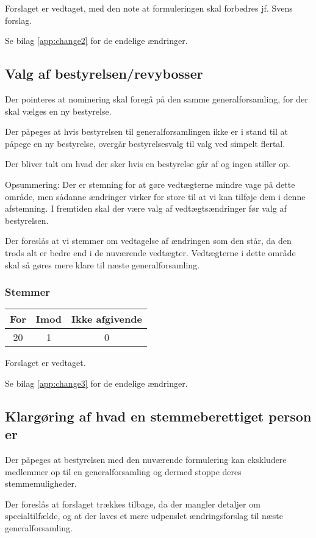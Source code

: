 \documentclass[a4paper,11pt]{report}
\begin{document}
Forslaget er vedtaget, med den note at formuleringen skal forbedres jf. Svens
forslag.

Se bilag \ref{app:change2} for de endelige ændringer.

\subsection*{Valg af bestyrelsen/revybosser}

Der pointeres at nominering skal foregå på den samme generalforsamling, for der
skal vælges en ny bestyrelse.

Der påpeges at hvis bestyrelsen til generalforsamlingen ikke er i stand til at
påpege en ny bestyrelse, overgår bestyrelsesvalg til valg ved simpelt flertal.

Der bliver talt om hvad der sker hvis en bestyrelse går af og ingen stiller op.

Opsummering: Der er stemning for at gøre vedtægterne mindre vage på dette
område, men sådanne ændringer virker for store til at vi kan tilføje dem i denne
afstemning.  I fremtiden skal der være valg af vedtægtsændringer før valg af
bestyrelsen.

Der foreslås at vi stemmer om vedtagelse af ændringen som den står, da den trods
alt er bedre end i de nuværende vedtægter.  Vedtægterne i dette område skal så
gøres mere klare til næste generalforsamling.

\subsubsection*{Stemmer}
\begin{tabular}{ c | c | c }
For & Imod & Ikke afgivende \\
\hline
20 & 1 & 0 \\
\end{tabular}

Forslaget er vedtaget.

Se bilag \ref{app:change3} for de endelige ændringer.

\subsection*{Klargøring af hvad en stemmeberettiget person er}

Der påpeges at bestyrelsen med den nuværende formulering kan ekskludere
medlemmer op til en generalforsamling og dermed stoppe deres stemmemuligheder.

Der foreslås at forslaget trækkes tilbage, da der mangler detaljer om specialtilfælde,
og at der laves et mere udpenslet ændringsforslag til næste generalforsamling.
\end{document}
